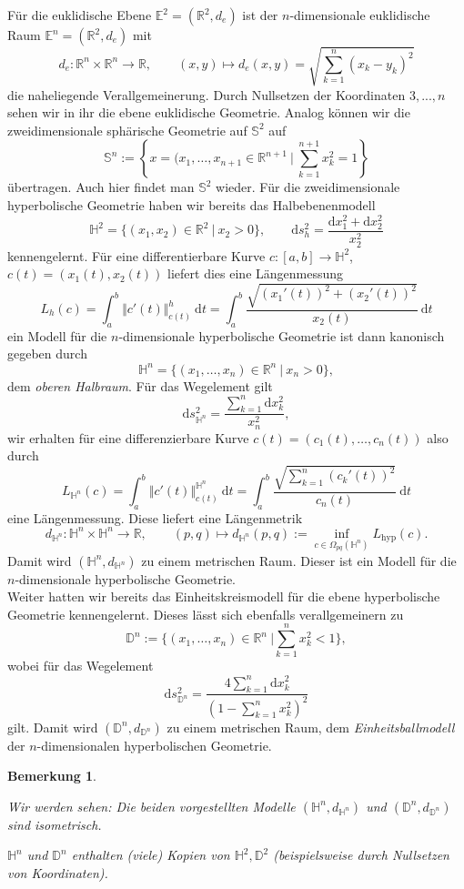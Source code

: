 \documentclass[11pt]{book}
\numberwithin{dummy}{section}
\newtheorem{remark}[theorem]{Bemerkung}
\theoremstyle{nonumberbreak}
\newcommand{\E}{\mathbb{E}}
\newcommand{\R}{\mathbb{R}}
\newcommand{\Sph}{\mathbb{S}}
\newcommand{\He}{\mathbb{H}}
\newcommand{\D}{\mathbb{D}}
\newcommand{\la}{\longrightarrow}
\begin{document}
\begin{spacing}{1.4}
Für die euklidische Ebene $\E^2= (\R^2, d_e)$ ist der $n$-dimensionale euklidische Raum $\E^n = (\R^2, d_e)$ mit 
$$d_e: \R^n \times \R^n \la \R, \qquad (x,y) \mapsto d_e(x,y) = \sqrt{\sum_{k=1}^n (x_k-y_k)^2}$$
die naheliegende Verallgemeinerung. Durch Nullsetzen der Koordinaten $3,...,n$ sehen wir in ihr die ebene euklidische Geometrie. Analog können wir die zweidimensionale sphärische Geometrie auf $\Sph^2$ auf $$\Sph^n:= \left\{ x=(x_1, \ldots, x_{n+1} \in \R^{n+1} \ \bigg\vert \ \sum_{k=1}^{n+1} x_k^2 = 1 \right\}$$
übertragen. Auch hier findet man $\Sph^2$ wieder. Für die zweidimensionale hyperbolische Geometrie haben wir bereits das Halbebenenmodell
$$\He^2 = \{ (x_1, x_2) \in \R^2 \ \vert \ x_2 >0 \}, \qquad \mathrm{d}s_{h}^2 = \frac{\mathrm{d}x_1^2 + \mathrm{d}x_2^2}{x_2^2}$$
kennengelernt. Für eine differentierbare Kurve $c:[a,b] \la \He^2$, $c(t) = (x_1(t), x_2(t))$ liefert dies eine Längenmessung
$$L_h(c) = \int_a^b \Vert c'(t)\Vert^{h}_{c(t)} \ \mathrm{d}t = \int_a^b \frac{\sqrt{(x_1'(t))^2 + (x_2'(t))^2}}{x_2(t)} \ \mathrm{d}t$$
ein Modell für die $n$-dimensionale hyperbolische Geometrie ist dann kanonisch gegeben durch 
$$\He^n = \{(x_1, \ldots, x_n) \in \R^n \ \vert \ x_n >0 \},$$
dem \textit{oberen Halbraum}. Für das Wegelement gilt 
$$\mathrm{d}s_{\mathbb{H}^n}^2 = \frac{\sum_{k=1}^n \mathrm{d}x_k^2}{x_n^2},$$
wir erhalten für eine differenzierbare Kurve $c(t) = (c_1(t), \ldots, c_n(t))$ also durch 
$$L_{\mathbb{H}^n}(c) =\int_a^b \Vert c'(t) \Vert^{\mathbb{H}^n}_{c(t)} \ \mathrm{d}t = \int_a^b \frac{\sqrt{\sum_{k=1}^n (c_k'(t))^2 }}{c_n(t)} \ \mathrm{d}t$$
eine Längenmessung. Diese liefert eine Längenmetrik
$$d_{\He^n}: \He^n \times \He^n \la \R, \qquad (p,q) \mapsto d_{\He^n}(p,q) := \inf_{c \in\Omega_{pq}(\He^n)} L_{\mathrm{hyp}}(c).$$
Damit wird $(\He^n, d_{\He^n})$ zu einem metrischen Raum. Dieser ist ein Modell für die $n$-dimensionale hyperbolische Geometrie.\\
Weiter hatten wir bereits das Einheitskreismodell für die ebene hyperbolische Geometrie kennengelernt. Dieses lässt sich ebenfalls verallgemeinern zu 
$$\D^n := \{ (x_1, \ldots, x_n) \in \R^n \ \vert \sum_{k=1}^n x_k^2 <1 \},$$
wobei für das Wegelement
$$\mathrm{d}s_{\D^n}^2 = \frac{4 \sum_{k=1}^n \mathrm{d}x_k^2}{\left( 1 - \sum_{k=1}^n x_k^2\right)^2}$$
gilt. Damit wird $(\D^n, d_{\D^n})$ zu einem metrischen Raum, dem \textit{Einheitsballmodell} der $n$-dimensionalen hyperbolischen Geometrie.

\begin{remark}
\begin{compactenum}
\item Wir werden sehen: Die beiden vorgestellten Modelle $(\He^n, d_{\He^n})$ und $(\D^n, d_{\D^n})$ sind isometrisch.
\item $\He^n$ und $\D^n$ enthalten (viele) Kopien von $\He^2, \D^2$ (beispielsweise durch Nullsetzen von Koordinaten).
\end{compactenum}


\end{remark}
\end{spacing}
\end{document}

